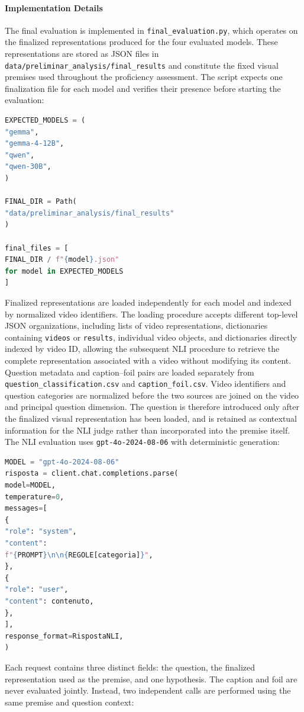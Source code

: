 \paragraph{Implementation Details}
The final evaluation is implemented in \texttt{final\_evaluation.py}, which operates on the finalized representations produced for the four evaluated models. These representations are stored as JSON files in \texttt{data/preliminar\_analysis/final\_results} and constitute the fixed visual premises used throughout the proficiency assessment. The script expects one finalization file for each model and verifies their presence before starting the evaluation:
\begin{lstlisting}[language=Python]
EXPECTED_MODELS = (
"gemma",
"gemma-4-12B",
"qwen",
"qwen-30B",
)

FINAL_DIR = Path(
"data/preliminar_analysis/final_results"
)

final_files = [
FINAL_DIR / f"{model}.json"
for model in EXPECTED_MODELS
]
\end{lstlisting}
Finalized representations are loaded independently for each model and indexed by normalized video identifiers. The loading procedure accepts different top-level JSON organizations, including lists of video representations, dictionaries containing \texttt{videos} or \texttt{results}, individual video objects, and dictionaries directly indexed by video ID, allowing the subsequent NLI procedure to retrieve the complete representation associated with a video without modifying its content.
Question metadata and caption--foil pairs are loaded separately from \texttt{question\_classification.csv} and \texttt{caption\_foil.csv}. Video identifiers and question categories are normalized before the two sources are joined on the video and principal question dimension. The question is therefore introduced only after the finalized visual representation has been loaded, and is retained as contextual information for the NLI judge rather than incorporated into the premise itself.
The NLI evaluation uses \texttt{gpt-4o-2024-08-06} with deterministic generation:
\begin{lstlisting}[language=Python]
MODEL = "gpt-4o-2024-08-06"
risposta = client.chat.completions.parse(
model=MODEL,
temperature=0,
messages=[
{
"role": "system",
"content":
f"{PROMPT}\n\n{REGOLE[categoria]}",
},
{
"role": "user",
"content": contenuto,
},
],
response_format=RispostaNLI,
)
\end{lstlisting}
Each request contains three distinct fields: the question, the finalized representation used as the premise, and one hypothesis. The caption and foil are never evaluated jointly. Instead, two independent calls are performed using the same premise and question context:
